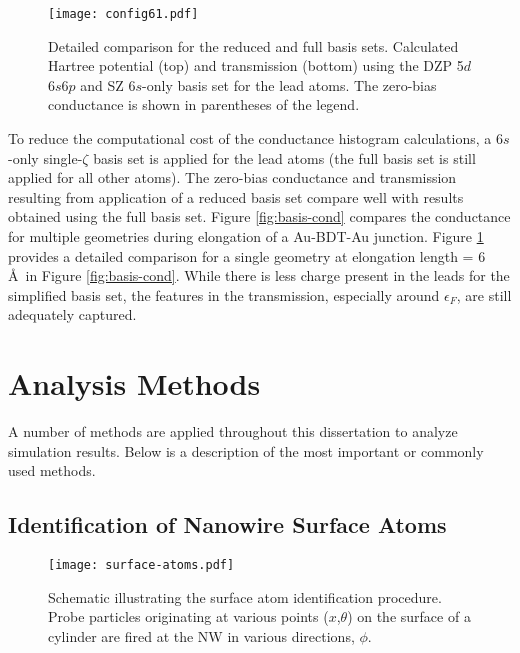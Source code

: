\documentclass[10pt]{report}  %
\newcommand\findent{\hspace*{\parindent}}
\begin{document}
\begin{figure}[t!]
	\centering
	\texttt{[image: config61.pdf]}
	\caption{ Detailed comparison for the reduced and full basis sets. Calculated Hartree potential (top) and transmission (bottom) using the DZP 5$d$6$s$6$p$ and SZ 6$s$-only basis set for the lead atoms. The zero-bias conductance is shown in parentheses of the legend. }
	\label{fig:config61}
\end{figure}

\findent To reduce the computational cost of the conductance histogram calculations, a 6$s$-only single-$\zeta$ basis set is applied for the lead atoms (the full basis set is still applied for all other atoms).\cite{Toher:2008} The zero-bias conductance and transmission resulting from application of a reduced basis set compare well with results obtained using the full basis set. Figure \ref{fig:basis-cond} compares the conductance for multiple geometries during elongation of a Au-BDT-Au junction.  Figure \ref{fig:config61} provides a detailed comparison for a single geometry at elongation length = 6 \AA\ in Figure \ref{fig:basis-cond}. While there is less charge present in the leads for the simplified basis set, the features in the transmission, especially around $\epsilon_{F}$, are still adequately captured.  

\section{Analysis Methods}

\findent A number of methods are applied throughout this dissertation to analyze simulation results. Below is a description of the most important or commonly used methods. 

\subsection{Identification of Nanowire Surface Atoms}

\begin{figure}[b!]
	\centering
	\texttt{[image: surface-atoms.pdf]}
	\caption{Schematic illustrating the surface atom identification procedure. Probe particles originating at various points ($x$,$\theta$) on the surface of a cylinder are fired at the NW in various directions, $\phi$.  }
	\label{fig:surface-atoms}
\end{figure}
\end{document}
